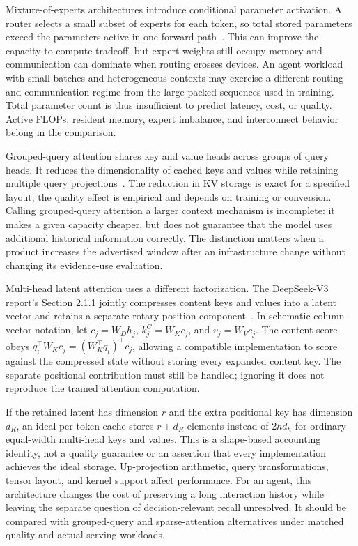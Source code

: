 Mixture-of-experts architectures introduce conditional parameter activation. A router selects a small subset of experts for each token, so total stored parameters exceed the parameters active in one forward path~\cite{shazeer2017moe}. This can improve the capacity-to-compute tradeoff, but expert weights still occupy memory and communication can dominate when routing crosses devices. An agent workload with small batches and heterogeneous contexts may exercise a different routing and communication regime from the large packed sequences used in training. Total parameter count is thus insufficient to predict latency, cost, or quality. Active FLOPs, resident memory, expert imbalance, and interconnect behavior belong in the comparison.

Grouped-query attention shares key and value heads across groups of query heads. It reduces the dimensionality of cached keys and values while retaining multiple query projections~\cite{ainslie2023gqa}. The reduction in KV storage is exact for a specified layout; the quality effect is empirical and depends on training or conversion. Calling grouped-query attention a larger context mechanism is incomplete: it makes a given capacity cheaper, but does not guarantee that the model uses additional historical information correctly. The distinction matters when a product increases the advertised window after an infrastructure change without changing its evidence-use evaluation.

Multi-head latent attention uses a different factorization. The DeepSeek-V3 report's Section 2.1.1 jointly compresses content keys and values into a latent vector and retains a separate rotary-position component~\cite{rewrite_deepseek3mla}. In schematic column-vector notation, let $c_j=W_Dh_j$, $k_j^C=W_Kc_j$, and $v_j=W_Vc_j$. The content score obeys $q_i^\top W_Kc_j=(W_K^\top q_i)^\top c_j$, allowing a compatible implementation to score against the compressed state without storing every expanded content key. The separate positional contribution must still be handled; ignoring it does not reproduce the trained attention computation.

If the retained latent has dimension $r$ and the extra positional key has dimension $d_R$, an ideal per-token cache stores $r+d_R$ elements instead of $2hd_h$ for ordinary equal-width multi-head keys and values. This is a shape-based accounting identity, not a quality guarantee or an assertion that every implementation achieves the ideal storage. Up-projection arithmetic, query transformations, tensor layout, and kernel support affect performance. For an agent, this architecture changes the cost of preserving a long interaction history while leaving the separate question of decision-relevant recall unresolved. It should be compared with grouped-query and sparse-attention alternatives under matched quality and actual serving workloads.

